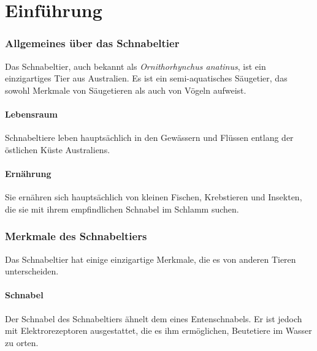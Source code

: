 \documentclass{article}
\begin{document}
\part{Einführung}
    \section{Allgemeines über das Schnabeltier}
    Das Schnabeltier, auch bekannt als \textit{Ornithorhynchus anatinus}, ist ein einzigartiges Tier aus Australien. Es ist ein semi-aquatisches Säugetier, das sowohl Merkmale von Säugetieren als auch von Vögeln aufweist.

        \subsection{Lebensraum}
        Schnabeltiere leben hauptsächlich in den Gewässern und Flüssen entlang der östlichen Küste Australiens.

        \subsection{Ernährung}
        Sie ernähren sich hauptsächlich von kleinen Fischen, Krebstieren und Insekten, die sie mit ihrem empfindlichen Schnabel im Schlamm suchen.

    \section{Merkmale des Schnabeltiers}
    Das Schnabeltier hat einige einzigartige Merkmale, die es von anderen Tieren unterscheiden.

        \subsection{Schnabel}
        Der Schnabel des Schnabeltiers ähnelt dem eines Entenschnabels. Er ist jedoch mit Elektrorezeptoren ausgestattet, die es ihm ermöglichen, Beutetiere im Wasser zu orten.
\end{document}

